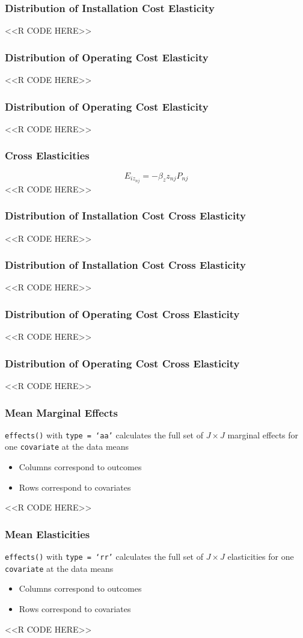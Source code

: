 \documentclass{beamer}
\begin{document}
\begin{frame}[fragile]\frametitle{Distribution of Installation Cost Elasticity}
    <<R CODE HERE>>
\end{frame}

\begin{frame}[fragile]\frametitle{Distribution of Operating Cost Elasticity}
    <<R CODE HERE>>
\end{frame}

\begin{frame}[fragile]\frametitle{Distribution of Operating Cost Elasticity}
    <<R CODE HERE>>
\end{frame}

\begin{frame}[fragile]\frametitle{Cross Elasticities}
	$$E_{iz_{nj}} = -\beta_z z_{nj} P_{nj}$$
    <<R CODE HERE>>
\end{frame}

\begin{frame}[fragile]\frametitle{Distribution of Installation Cost Cross Elasticity}
    <<R CODE HERE>>
\end{frame}

\begin{frame}[fragile]\frametitle{Distribution of Installation Cost Cross Elasticity}
    <<R CODE HERE>>
\end{frame}

\begin{frame}[fragile]\frametitle{Distribution of Operating Cost Cross Elasticity}
    <<R CODE HERE>>
\end{frame}

\begin{frame}[fragile]\frametitle{Distribution of Operating Cost Cross Elasticity}
    <<R CODE HERE>>
\end{frame}

\begin{frame}[fragile]\frametitle{Mean Marginal Effects}
	\texttt{effects()} with \texttt{type = `aa'} calculates the full set of $J \times J$ marginal effects for one \texttt{covariate} at the data means
    \begin{itemize}
        \item Columns correspond to outcomes
        \item Rows correspond to covariates
    \end{itemize}
    <<R CODE HERE>>
\end{frame}

\begin{frame}[fragile]\frametitle{Mean Elasticities}
	\texttt{effects()} with \texttt{type = `rr'} calculates the full set of $J \times J$ elasticities for one \texttt{covariate} at the data means
    \begin{itemize}
        \item Columns correspond to outcomes
        \item Rows correspond to covariates
    \end{itemize}
    <<R CODE HERE>>
\end{frame}
\end{document}
